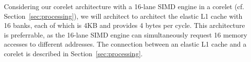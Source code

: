Considering our corelet architecture with a 16-lane SIMD engine in a corelet (cf. Section~\ref{sec:processing}), 
we will architect to architect the elastic L1 cache with 16 banks, each of which is 4KB and provides 4 bytes per cycle. 
This architecture is preferrable, as the 16-lane SIMD engine can simultaneously request 16 memory accesses to different addresses.
The connection between an elastic L1 cache and a corelet is described in Section~\ref{sec:processing}.

